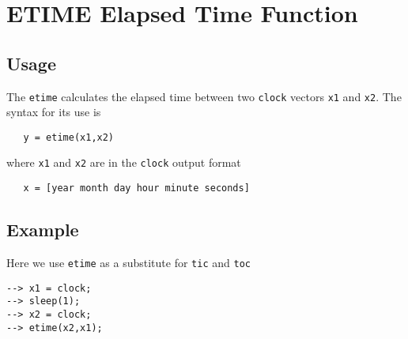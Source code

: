 \section{ETIME Elapsed Time Function}

\subsection{Usage}

The \verb|etime| calculates the elapsed time between two \verb|clock| vectors
\verb|x1| and \verb|x2|.  The syntax for its use is
\begin{verbatim}
   y = etime(x1,x2)
\end{verbatim}
where \verb|x1| and \verb|x2| are in the \verb|clock| output format
\begin{verbatim}
   x = [year month day hour minute seconds]
\end{verbatim}
\subsection{Example}

Here we use \verb|etime| as a substitute for \verb|tic| and \verb|toc|
\begin{verbatim}
--> x1 = clock;
--> sleep(1);
--> x2 = clock;
--> etime(x2,x1);
\end{verbatim}

